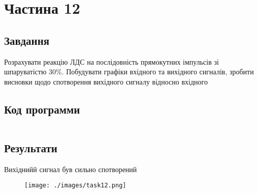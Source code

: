 \section{Частина 12}
\label{sec:task12}

\subsection{Завдання}
\label{subsec:task12_task}

Розрахувати реакцію ЛДС на послідовність прямокутних імпульсів зі
шпаруватістю 30\%. Побудувати графіки вхідного та вихідного
сигналів, зробити висновки щодо спотворення вихідного сигналу відносно
вхідного

\subsection{Код программи}
\label{subsec:task12_code}
\inputminted{python}{../src/task12.py}

\subsection{Результати}
\label{subsec:task12_results}

Вихіднийй сигнал був сильно спотворений

\begin{figure}[!ht]
    \centering
    \texttt{[image: ./images/task12.png]}
\end{figure}
